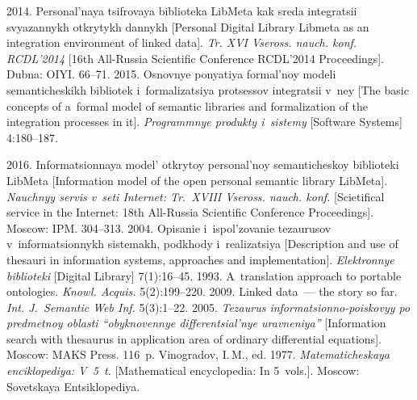   \begin{multicols}{2}

\renewcommand{\bibname}{\protect\rmfamily References}

{\small\frenchspacing
 {%
 \begin{thebibliography}{9} 

 2014. Personal'naya tsifrovaya 
biblioteka LibMeta kak sreda integratsii svyazannykh otkrytykh dannykh [Personal 
Digital Library Libmeta as an integration environment of linked data]. \textit{Tr. XVI 
Vseross. nauch. konf. RCDL'2014}
[16th All-Russia Scientific Conference RCDL'2014 Proceedings]. Dubna: OIYI. 66--71.
 2015. Osnovnye ponyatiya  
formal'noy modeli se\-man\-ti\-che\-skikh bib\-lio\-tek i~formalizatsiya protsessov 
integratsii v~ney [The basic concepts of a~formal model of semantic libraries 
and formalization of the integration processes in it]. \textit{Programmnye produkty 
i~sistemy} [Software Systems] 4:180--187.

 2016. Informatsionnaya model' 
otkrytoy personal'noy semanticheskoy biblioteki LibMeta
[Information model of the open
personal semantic library LibMeta]. 
\textit{Nauchnyy servis v~seti Internet: Tr.\ XVIII Vseross. nauch. konf.}   
[Scietifical service in the Internet: 18th All-Russia Scientific Conference Proceedings]. 
Moscow: IPM.  304--313.
 2004. Opisanie i~ispol'zovanie tezaurusov 
v~informatsionnykh sistemakh, podkhody i~realizatsiya [Description and use of thesauri 
in information systems, approaches and implementation].\linebreak
 \textit{Elektronnye biblioteki} 
[Digital Library] 7(1):16--45.
 1993. A~translation approach to portable ontologies. 
\textit{Knowl. Acquis.} 5(2):199--220.
 2009. Linked data~--- the story so far. 
\textit{Int. J.~Semantic Web Inf.} 5(3):1--22.
 2005. \textit{Tezaurus 
informatsionno-poiskovyy po predmetnoy oblasti ``obyknovennye differentsial'nye 
uravneniya''} [Information search with thesaurus in application area of ordinary 
differential equations].  Moscow: MAKS Press. 116~p.
Vinogradov, I.\,M., ed. 1977.
\textit{Matematicheskaya enciklopediya: V~5~t.} [Mathematical encyclopedia: In 5~vols.]. 
Moscow: Sovetskaya Entsiklopediya.

\end{thebibliography}

 }
 }

\end{multicols}

